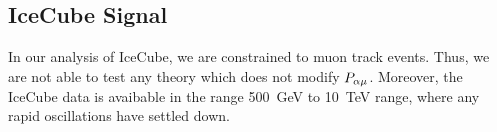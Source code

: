 
\subsection{IceCube Signal}
In our analysis of IceCube, we are constrained to muon track events. Thus, we are not able to test any theory which does not modify $P_{\alpha \mu}$. Moreover,
the IceCube data is avaibable in the range \SI{500}{\GeV} to \SI{10}{\TeV} range, where any rapid oscillations have settled down.

